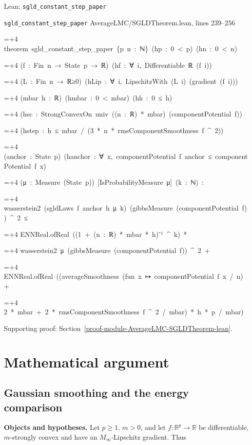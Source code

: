 \documentclass[11pt,a4paper]{report}
\newlength{\leancharwidth}
\newenvironment{leancode}{\par\smallskip\begingroup\ttfamily\footnotesize\raggedright
  \settowidth{\leancharwidth}{M}\setlength{\parskip}{0pt}\setlength{\parindent}{0pt}
  \frenchspacing}{\par\endgroup\smallskip}
\newcommand{\leanline}[2]{\hangindent=\dimexpr#1\leancharwidth+4\leancharwidth\relax
  \hangafter=1\noindent\hspace*{#1\leancharwidth}#2\par}
\newcommand{\leansource}[1]{\par{\footnotesize\color{leanmuted}#1}\par}
\begin{document}
\begin{leanbox}{Lean: \texttt{sgld\_\allowbreak{}constant\_\allowbreak{}step\_\allowbreak{}paper}}
\leansource{\texttt{sgld\_\allowbreak{}constant\_\allowbreak{}step\_\allowbreak{}paper} \quad AverageLMC/\allowbreak{}SGLDTheorem.lean, lines 239–256}
\begin{leancode}
\leanline{0}{theorem\ sgld\_constant\_step\_paper\ \{p\ n\ :\ ℕ\}\ (hp\ :\ 0\ <\ p)\ (hn\ :\ 0\ <\ n)}
\leanline{4}{(f\ :\ Fin\ n\ →\ State\ p\ →\ ℝ)\ (hf\ :\ ∀\ i,\ Differentiable\ ℝ\ (f\ i))}
\leanline{4}{(L\ :\ Fin\ n\ →\ ℝ≥0)\ (hLip\ :\ ∀\ i,\ LipschitzWith\ (L\ i)\ (gradient\ (f\ i)))}
\leanline{4}{(mbar\ h\ :\ ℝ)\ (hmbar\ :\ 0\ <\ mbar)\ (hh\ :\ 0\ ≤\ h)}
\leanline{4}{(hsc\ :\ StrongConvexOn\ univ\ ((n\ :\ ℝ)\ *\ mbar)\ (componentPotential\ f))}
\leanline{4}{(hstep\ :\ h\ ≤\ mbar\ /\ (3\ *\ n\ *\ rmsComponentSmoothness\ f\ \textasciicircum{}\ 2))}
\leanline{4}{(anchor\ :\ State\ p)\ (hanchor\ :\ ∀\ x,\ componentPotential\ f\ anchor\ ≤\ componentPotential\ f\ x)}
\leanline{4}{(μ\ :\ Measure\ (State\ p))\ [IsProbabilityMeasure\ μ]\ (k\ :\ ℕ)\ :}
\leanline{4}{wasserstein2\ (sgldLaws\ f\ anchor\ h\ μ\ k)\ (gibbsMeasure\ (componentPotential\ f))\ \textasciicircum{}\ 2\ ≤}
\leanline{6}{ENNReal.ofReal\ ((1\ +\ (n\ :\ ℝ)\ *\ mbar\ *\ h)⁻¹\ \textasciicircum{}\ k)\ *}
\leanline{8}{wasserstein2\ μ\ (gibbsMeasure\ (componentPotential\ f))\ \textasciicircum{}\ 2\ +}
\leanline{6}{ENNReal.ofReal\ ((averageSmoothness\ (fun\ x\ ↦\ componentPotential\ f\ x\ /\ n)\ +}
\leanline{8}{2\ *\ mbar\ +\ 2\ *\ rmsComponentSmoothness\ f\ \textasciicircum{}\ 2\ /\ mbar)\ *\ h\ *\ p\ /\ mbar)}
\end{leancode}
\end{leanbox}

{\small\color{gray}Supporting proof: Section~\ref{proof-module-AverageLMC-SGLDTheorem-lean}.\par}
\chapter{Mathematical argument}
\section{\texorpdfstring{Gaussian smoothing and the energy comparison}{Gaussian smoothing and the energy comparison}}



\textbf{Objects and hypotheses.} Let \(p\ge1\), \(m>0\), and let \(f:\mathbb R^p\to\mathbb R\) be differentiable, \(m\)-strongly convex and have an \(M_\infty\)-Lipschitz gradient. Thus
\end{document}
